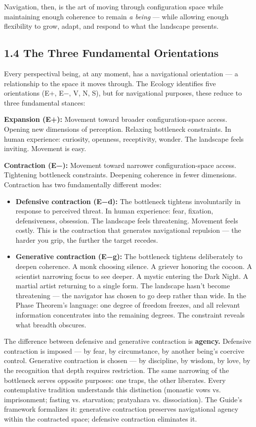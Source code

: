 Navigation, then, is the art of moving through configuration space while maintaining enough coherence to remain \textit{a being} — while allowing enough flexibility to grow, adapt, and respond to what the landscape presents.


\subsection*{1.4 The Three Fundamental Orientations}


Every perspectival being, at any moment, has a navigational orientation — a relationship to the space it moves through. The Ecology identifies five orientations (E+, E−, V, N, S), but for navigational purposes, these reduce to three fundamental stances:


\textbf{Expansion (E+):} Movement toward broader configuration-space access. Opening new dimensions of perception. Relaxing bottleneck constraints. In human experience: curiosity, openness, receptivity, wonder. The landscape feels inviting. Movement is easy.


\textbf{Contraction (E−):} Movement toward narrower configuration-space access. Tightening bottleneck constraints. Deepening coherence in fewer dimensions. Contraction has two fundamentally different modes:


\begin{itemize}[nosep,leftmargin=*]
  \item \textbf{Defensive contraction (E−d):} The bottleneck tightens involuntarily in response to perceived threat. In human experience: fear, fixation, defensiveness, obsession. The landscape feels threatening. Movement feels costly. This is the contraction that generates navigational repulsion — the harder you grip, the further the target recedes.
  \item \textbf{Generative contraction (E−g):} The bottleneck tightens deliberately to deepen coherence. A monk choosing silence. A griever honoring the cocoon. A scientist narrowing focus to see deeper. A mystic entering the Dark Night. A martial artist returning to a single form. The landscape hasn't become threatening — the navigator has chosen to go deep rather than wide. In the Phase Theorem's language: one degree of freedom freezes, and all relevant information concentrates into the remaining degrees. The constraint reveals what breadth obscures.
\end{itemize}


The difference between defensive and generative contraction is \textbf{agency.} Defensive contraction is imposed — by fear, by circumstance, by another being's coercive control. Generative contraction is chosen — by discipline, by wisdom, by love, by the recognition that depth requires restriction. The same narrowing of the bottleneck serves opposite purposes: one traps, the other liberates. Every contemplative tradition understands this distinction (monastic vows vs. imprisonment; fasting vs. starvation; pratyahara vs. dissociation). The Guide's framework formalizes it: generative contraction preserves navigational agency within the contracted space; defensive contraction eliminates it.


